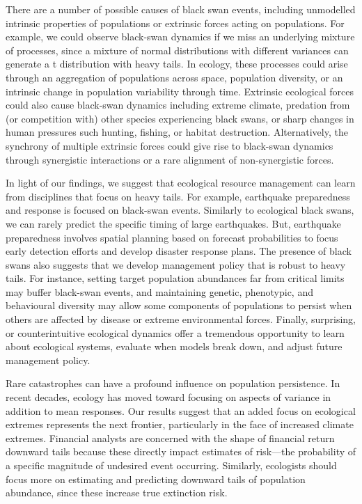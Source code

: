 There are a number of possible causes of black swan events, including unmodelled intrinsic properties of populations or extrinsic forces acting on populations. For example, we could observe black-swan dynamics if we miss an underlying mixture of processes, since a mixture of normal distributions with different variances can generate a t distribution with heavy tails\cite{allen2001}. In ecology, these processes could arise through an aggregation of populations across space, population diversity\cite{schindler2010}, or an intrinsic change in population variability through time\cite{carpenter2006}. Extrinsic ecological forces could also cause black-swan dynamics\cite{nunez2012} including extreme climate\cite{meehl2004, katz2005, ipcc2012}, predation from (or competition with) other species experiencing black swans, or sharp changes in human pressures such hunting, fishing, or habitat destruction. Alternatively, the synchrony of multiple extrinsic forces could give rise to black-swan dynamics through synergistic interactions\cite{kirby2009} or a rare alignment of non-synergistic forces\cite{denny2009}.

In light of our findings, we suggest that ecological resource management can learn from disciplines that focus on heavy tails. For example, earthquake preparedness and response is focused on black-swan events. Similarly to ecological black swans, we can rarely predict the specific timing of large earthquakes. But, earthquake preparedness involves spatial planning based on forecast probabilities to focus early detection efforts and develop disaster response plans\cite{nrc2007}. The presence of black swans also suggests that we develop management policy that is robust to heavy tails. For instance, setting target population abundances far from critical limits may buffer black-swan events\cite{caddy1996}, and maintaining genetic, phenotypic, and behavioural diversity may allow some components of populations to persist when others are affected by disease or extreme environmental forces\cite{schindler2010}. Finally, surprising, or counterintuitive ecological dynamics offer a tremendous opportunity to learn about ecological systems, evaluate when models break down, and adjust future management policy\cite{doak2008, lindenmayer2010}.

Rare catastrophes can have a profound influence on population persistence\cite{mangel1994}. In recent decades, ecology has moved toward focusing on aspects of variance in addition to mean responses\cite{loreau2010a, thompson2013}. Our results suggest that an added focus on ecological extremes represents the next frontier, particularly in the face of increased climate extremes\cite{meehl2004, ipcc2012, thompson2013}. Financial analysts are concerned with the shape of financial return downward tails because these directly impact estimates of risk---the probability of a specific magnitude of undesired event occurring\cite{rachev2008}. Similarly, ecologists should focus more on estimating and predicting downward tails of population abundance, since these increase true extinction risk.

